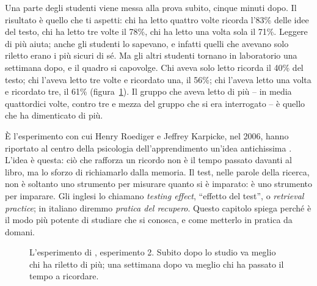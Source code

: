 Una parte degli studenti viene messa alla prova subito, cinque minuti
dopo. Il risultato è quello che ti aspetti: chi ha letto quattro volte
ricorda l'83\% delle idee del testo, chi ha letto tre volte il 78\%, chi
ha letto una volta sola il 71\%. Leggere di più aiuta; anche gli
studenti lo sapevano, e infatti quelli che avevano solo riletto erano i
più sicuri di sé. Ma gli altri studenti tornano in laboratorio una
settimana dopo, e il quadro si capovolge. Chi aveva solo letto ricorda
il 40\% del testo; chi l'aveva letto tre volte e ricordato una, il 56\%;
chi l'aveva letto una volta e ricordato tre, il 61\%
(figura~\ref{fig:roediger}). Il gruppo che aveva letto di più -- in
media quattordici volte, contro tre e mezza del gruppo che si era
interrogato -- è quello che ha dimenticato di più.

È l'esperimento con cui Henry Roediger e Jeffrey Karpicke, nel 2006,
hanno riportato al centro della psicologia dell'apprendimento un'idea
antichissima \parencite{roediger2006}. L'idea è questa: ciò che rafforza
un ricordo non è il tempo passato davanti al libro, ma lo sforzo di
richiamarlo dalla memoria. Il test, nelle parole della ricerca, non è
soltanto uno strumento per misurare quanto si è imparato: è uno
strumento per imparare. Gli inglesi lo chiamano \emph{testing effect},
\enquote{effetto del test}, o \emph{retrieval practice}; in italiano
diremmo \emph{pratica del recupero}. Questo capitolo spiega perché è il
modo più potente di studiare che si conosca, e come metterlo in pratica
da domani.

\begin{figure}[tbp]
  \centering
  \caption{L'esperimento di \textcite{roediger2006}, esperimento 2.
    Subito dopo lo studio va meglio chi ha riletto di più; una settimana
    dopo va meglio chi ha passato il tempo a ricordare.}
  \label{fig:roediger}
\end{figure}

